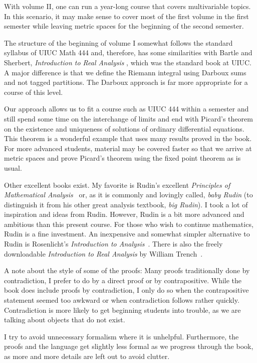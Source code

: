 With volume II\@, one can run a year-long course that covers multivariable
topics.  In this scenario, it may make sense to cover most of the first volume
in the first semester while leaving metric spaces for the beginning of the
second semester.

The structure of the beginning of volume I somewhat follows the
standard syllabus of UIUC Math 444 and, therefore, has some similarities with
Bartle and Sherbert,
\emph{Introduction to Real Analysis} \cite{BS}, which was the standard book
at UIUC\@.
A major difference is that we define the Riemann integral using
Darboux sums and not tagged partitions.  The Darboux approach is far more
appropriate for a course of this level.

Our approach allows us to fit a course such as UIUC 444 within a semester
and still spend some time on the interchange of limits and end with
Picard's theorem on the existence and uniqueness of solutions of ordinary
differential equations.
This theorem is a wonderful example
that uses many results proved in the book.  For more advanced students,
material may be covered faster so that we arrive at metric spaces and
prove Picard's theorem using the fixed point theorem as is usual.

Other excellent books exist.  My favorite is 
Rudin's excellent
\emph{Principles of Mathematical Analysis}~\cite{Rudin:baby}
or, as it is commonly and lovingly called, \emph{baby Rudin}
(to distinguish it from his other great analysis textbook,
\emph{big Rudin}).  I took a
lot of inspiration and ideas from Rudin.  However, Rudin is a bit more
advanced and ambitious than this present course.
For those who wish to continue
mathematics, Rudin is a fine investment.
An inexpensive and somewhat simpler alternative to Rudin is
Rosenlicht's \emph{Introduction to Analysis}~\cite{Rosenlicht}.
There is also the freely downloadable \emph{Introduction to Real
Analysis} by William Trench~\cite{Trench}.

\medskip

A note about the style of some of the proofs:  Many proofs
traditionally done by contradiction, I prefer to do by
a direct proof or by contrapositive.  While the book does include
proofs by contradiction, I only
do so when the contrapositive statement seemed too awkward or when 
contradiction follows rather quickly.
Contradiction is more likely to get beginning students into trouble,
as we are talking about objects that do not exist.

I try to avoid unnecessary formalism where it is unhelpful.
Furthermore, the proofs and the language get slightly less formal as we
progress through the book, as more and more details are left out to avoid
clutter.

